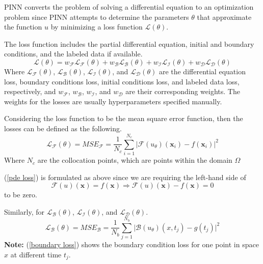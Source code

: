 \documentclass[a4paper, onecolumn, 12pt]{article}
\begin{document}
PINN converts the problem of solving a differential equation 
to an optimization problem since PINN attempts to determine the parameters $\theta$ 
that approximate the function $u$ by minimizing a loss function $\mathcal{L}(\theta)$\cite{cuomo2022scientific}.

The loss function includes the partial differential equation, initial and boundary conditions, and 
the labeled data if available.
\begin{equation}
\mathcal{L}(\theta) = w_{\mathcal{F}} \mathcal{L}_{\mathcal{F}}(\theta)
+ w_{\mathcal{B}} \mathcal{L}_{\mathcal{B}}(\theta) 
+ w_{\mathcal{I}} \mathcal{L}_{\mathcal{I}}(\theta)
+ w_{\mathcal{D}} \mathcal{L}_{\mathcal{D}}(\theta)
\end{equation}
Where $\mathcal{L}_{\mathcal{F}}(\theta)$, $\mathcal{L}_{\mathcal{B}}(\theta)$, 
$\mathcal{L}_{\mathcal{I}}(\theta)$, and $\mathcal{L}_{\mathcal{D}}(\theta)$ are the differential equation loss,
boundary conditions loss, initial conditions loss, and labeled data loss, respectively, and $w_{\mathcal{F}}$, 
$w_{\mathcal{B}}$, $w_{\mathcal{I}}$, and $w_{\mathcal{D}}$ are their corresponding weights. 
The weights for the losses are usually hyperparameters specified manually.

Considering the loss function to be the mean square error function, then the losses can be 
defined as the following.
\begin{equation}\label{pde loss}
\mathcal{L}_{\mathcal{F}}(\theta) = MSE_{\mathcal{F}} 
= \frac{1}{N_c} \sum_{i=1}^{N_c} \bigg| \mathcal{F}(u_\theta)(\mathbf{x}_i) - f(\mathbf{x}_i) \bigg|^2
\end{equation}
Where $N_c$ are the collocation points, which are points within the domain $\Omega$

(\ref{pde loss}) is formulated as above since we are requiring the left-hand side of 
$$
\mathcal{F}(u)(\mathbf{x}) = f(\mathbf{x})  \Rightarrow 
\mathcal{F}(u)(\mathbf{x}) - f(\mathbf{x}) = 0
$$
to be zero.

Similarly, for $\mathcal{L}_{\mathcal{B}}(\theta)$,  $\mathcal{L}_{\mathcal{I}}(\theta)$, and 
$\mathcal{L}_{\mathcal{D}}(\theta)$.
\begin{equation}\label{boundary loss}
\mathcal{L}_{\mathcal{B}}(\theta) = MSE_{\mathcal{B}} 
= \frac{1}{N_b} \sum_{j=1}^{N_b} \bigg| \mathcal{B}(u_\theta)(x, t_j) - g(t_j) \bigg|^2
\end{equation}
\textbf{Note:} (\ref{boundary loss}) shows the boundary condition loss for one point in space $x$ 
at different time $t_j$. 
\end{document}
